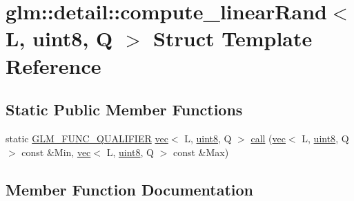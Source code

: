\hypertarget{structglm_1_1detail_1_1compute__linear_rand_3_01_l_00_01uint8_00_01_q_01_4}{}\section{glm\+:\+:detail\+:\+:compute\+\_\+linear\+Rand$<$ L, uint8, Q $>$ Struct Template Reference}
\label{structglm_1_1detail_1_1compute__linear_rand_3_01_l_00_01uint8_00_01_q_01_4}
\subsection*{Static Public Member Functions}
\begin{DoxyCompactItemize}
\item 
static \mbox{\hyperlink{setup_8hpp_a33fdea6f91c5f834105f7415e2a64407}{G\+L\+M\+\_\+\+F\+U\+N\+C\+\_\+\+Q\+U\+A\+L\+I\+F\+I\+ER}} \mbox{\hyperlink{structglm_1_1vec}{vec}}$<$ L, \mbox{\hyperlink{namespaceglm_1_1detail_aef2588f97d090cc19fbbe0c74fe17c8f}{uint8}}, Q $>$ \mbox{\hyperlink{structglm_1_1detail_1_1compute__linear_rand_3_01_l_00_01uint8_00_01_q_01_4_a4eabc0e8296fcd79054e1057ff7a06f7}{call}} (\mbox{\hyperlink{structglm_1_1vec}{vec}}$<$ L, \mbox{\hyperlink{namespaceglm_1_1detail_aef2588f97d090cc19fbbe0c74fe17c8f}{uint8}}, Q $>$ const \&Min, \mbox{\hyperlink{structglm_1_1vec}{vec}}$<$ L, \mbox{\hyperlink{namespaceglm_1_1detail_aef2588f97d090cc19fbbe0c74fe17c8f}{uint8}}, Q $>$ const \&Max)
\end{DoxyCompactItemize}


\subsection{Member Function Documentation}
\mbox{\label{structglm_1_1detail_1_1compute__linear_rand_3_01_l_00_01uint8_00_01_q_01_4_a4eabc0e8296fcd79054e1057ff7a06f7}} 
